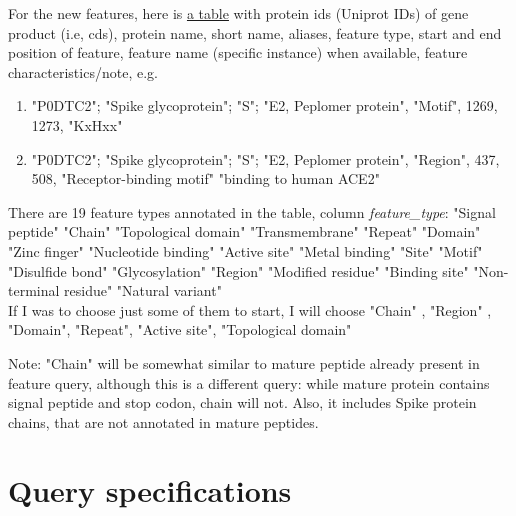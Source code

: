 \documentclass[a4paper, 10pt]{article}
\begin{document}
For the new features, here is \href{https://github.com/clauw87/virusbeacon/blob/raw_ideas/anomer.csv}{a table} with protein ids (Uniprot IDs) of gene product (i.e, cds), protein name, short name, aliases, feature type, start and end position of feature, feature name (specific instance) when available,  feature characteristics/note, e.g.\\
\begin{enumerate}
\item "P0DTC2"; "Spike glycoprotein"; "S"; "E2, Peplomer protein", "Motif", 1269, 1273, "KxHxx"\\
\item "P0DTC2"; "Spike glycoprotein"; "S"; "E2, Peplomer protein", "Region", 437, 508, "Receptor-binding motif" "binding to human ACE2"
\end{enumerate}
There are 19 feature types annotated in the table, column \textit{feature\_type}:  
"Signal peptide"       "Chain"                "Topological domain"   "Transmembrane"        "Repeat"               "Domain"               "Zinc finger"          "Nucleotide binding"   "Active site"          "Metal binding"        "Site"                 "Motif"                "Disulfide bond"       "Glycosylation"        "Region"               "Modified residue"    "Binding site"         "Non-terminal residue" "Natural variant"  \\
If I was to choose just some of them to start, I will choose "Chain" , "Region" , "Domain", "Repeat", "Active site", "Topological domain"


Note: "Chain" will be somewhat similar to mature peptide already present in feature query, although this is a different query: while mature protein contains signal peptide and stop codon, chain will not. Also, it includes Spike protein chains, that are not annotated in mature peptides.




\section{Query specifications}
\end{document}
